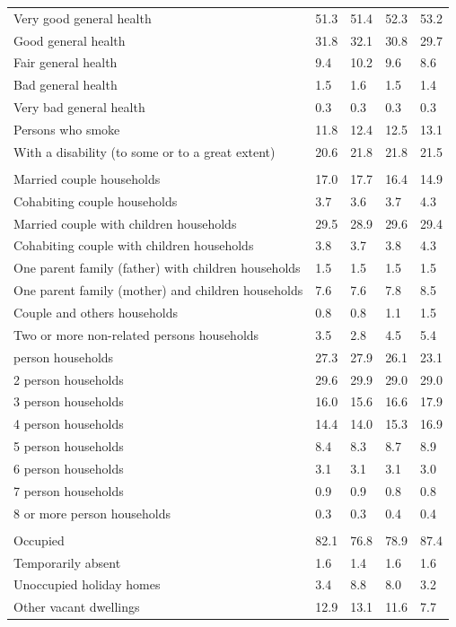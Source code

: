 \documentclass{article}
\begin{document}
\begin{table}[h]
\begin{tabular}{KTTTT}
    \hline
Very good general health & 51.3& 51.4&52.3& 53.2\\
Good general health & 31.8& 32.1& 30.8& 29.7\\
Fair general health &  9.4& 10.2& 9.6&  8.6\\
Bad general health & 1.5& 1.6&1.5& 1.4\\
Very bad general health & 0.3& 0.3&0.3& 0.3\\
    \hline
Persons who smoke & 11.8& 12.4&12.5& 13.1\\
    \hline
With a disability (to some or to a great extent) & 20.6& 21.8&21.8& 21.5\\
\hline
    \\ 
    \hline
Married couple households & 17.0& 17.7& 16.4& 14.9\\
Cohabiting couple households & 3.7& 3.6& 3.7& 4.3\\
Married couple with children households & 29.5& 28.9& 29.6& 29.4\\
Cohabiting couple with children households & 3.8& 3.7& 3.8& 4.3\\
One parent family (father) with  children households & 1.5& 1.5& 1.5& 1.5\\
One parent family (mother) and children households & 7.6& 7.6& 7.8& 8.5\\
Couple and others households  & 0.8& 0.8& 1.1& 1.5\\
Two or more non-related persons households & 3.5& 2.8& 4.5& 5.4\\
     person households & 27.3& 27.9& 26.1& 23.1\\
2 person households & 29.6& 29.9& 29.0& 29.0\\
3 person households & 16.0& 15.6& 16.6& 17.9\\
4 person households & 14.4& 14.0& 15.3& 16.9\\
5 person households & 8.4& 8.3& 8.7& 8.9\\
6 person households & 3.1& 3.1& 3.1& 3.0\\
7 person households & 0.9& 0.9& 0.8& 0.8\\
8 or more person households & 0.3& 0.3& 0.4& 0.4\\
\hline
    \\ 
    \hline
Occupied & 82.1& 76.8& 78.9& 87.4\\
Temporarily absent & 1.6& 1.4& 1.6& 1.6\\
Unoccupied holiday homes & 3.4& 8.8& 8.0& 3.2\\
Other vacant dwellings & 12.9& 13.1& 11.6&  7.7\\
\hline
\end{tabular}
\end{table}
\end{document}
